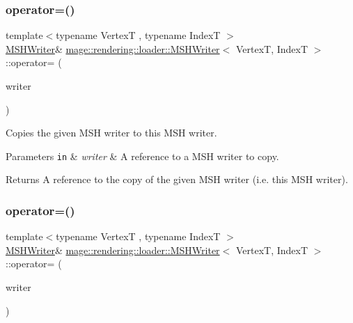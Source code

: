 \subsubsection{\texorpdfstring{operator=()}{operator=()}\hspace{0.1cm}{\footnotesize\ttfamily [1/2]}}
{\footnotesize\ttfamily template$<$typename VertexT , typename IndexT $>$ \\
\mbox{\hyperlink{classmage_1_1rendering_1_1loader_1_1_m_s_h_writer}{M\+S\+H\+Writer}}\& \mbox{\hyperlink{classmage_1_1rendering_1_1loader_1_1_m_s_h_writer}{mage\+::rendering\+::loader\+::\+M\+S\+H\+Writer}}$<$ VertexT, IndexT $>$\+::operator= (\begin{DoxyParamCaption}\item[{const \mbox{\hyperlink{classmage_1_1rendering_1_1loader_1_1_m_s_h_writer}{M\+S\+H\+Writer}}$<$ VertexT, IndexT $>$ \&}]{writer }\end{DoxyParamCaption})\hspace{0.3cm}{\ttfamily [delete]}}

Copies the given M\+SH writer to this M\+SH writer.


\begin{DoxyParams}[1]{Parameters}
\mbox{\tt in}  & {\em writer} & A reference to a M\+SH writer to copy. \\
\hline
\end{DoxyParams}
\begin{DoxyReturn}{Returns}
A reference to the copy of the given M\+SH writer (i.\+e. this M\+SH writer). 
\end{DoxyReturn}
\mbox{\label{classmage_1_1rendering_1_1loader_1_1_m_s_h_writer_a98bdde59fa1a7a6398453f0c7bc4e8dd}} 
\subsubsection{\texorpdfstring{operator=()}{operator=()}\hspace{0.1cm}{\footnotesize\ttfamily [2/2]}}
{\footnotesize\ttfamily template$<$typename VertexT , typename IndexT $>$ \\
\mbox{\hyperlink{classmage_1_1rendering_1_1loader_1_1_m_s_h_writer}{M\+S\+H\+Writer}}\& \mbox{\hyperlink{classmage_1_1rendering_1_1loader_1_1_m_s_h_writer}{mage\+::rendering\+::loader\+::\+M\+S\+H\+Writer}}$<$ VertexT, IndexT $>$\+::operator= (\begin{DoxyParamCaption}\item[{\mbox{\hyperlink{classmage_1_1rendering_1_1loader_1_1_m_s_h_writer}{M\+S\+H\+Writer}}$<$ VertexT, IndexT $>$ \&\&}]{writer }\end{DoxyParamCaption})\hspace{0.3cm}{\ttfamily [delete]}}

